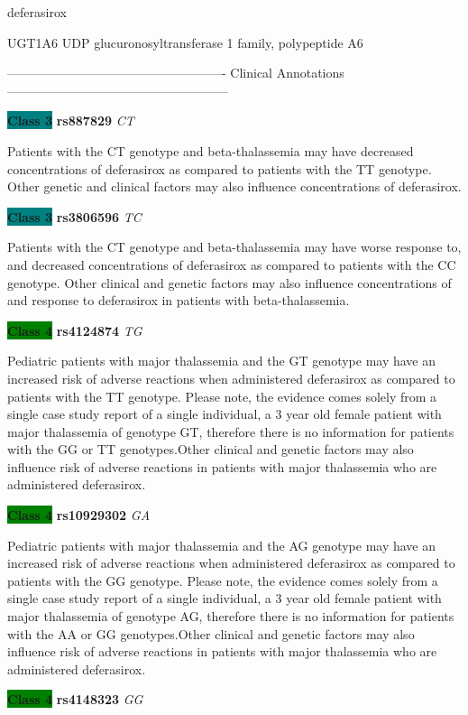 \documentclass{resume} %
\begin{document}
\begin{rSection}{ deferasirox }
\begin{rSubsection}{ UGT1A6 }{ UDP glucuronosyltransferase 1 family, polypeptide A6 }{}{}
\item[] ---------------------------------------------------- Clinical Annotations -----------------------------------------------------\newline
\item \textbf{\colorbox{teal} {Class 3}} \textbf{ rs887829 } \textit{ CT }
\item[] Patients with the CT genotype and beta-thalassemia may have decreased concentrations of deferasirox as compared to patients with the TT genotype. Other genetic and clinical factors may also influence concentrations of deferasirox.\item \textbf{\colorbox{teal} {Class 3}} \textbf{ rs3806596 } \textit{ TC }
\item[] Patients with the CT genotype and beta-thalassemia may have worse response to, and decreased concentrations of deferasirox as compared to patients with the CC genotype. Other clinical and genetic factors may also influence concentrations of and response to deferasirox in patients with beta-thalassemia.\item \textbf{\colorbox{green} {Class 4}} \textbf{ rs4124874 } \textit{ TG }
\item[] Pediatric patients with major thalassemia and the GT genotype may have an increased risk of adverse reactions when administered deferasirox as compared to patients with the TT genotype. Please note, the evidence comes solely from a single case study report of a single individual, a 3 year old female patient with major thalassemia of genotype GT, therefore there is no information for patients with the GG or TT genotypes.Other clinical and genetic factors may also influence risk of adverse reactions in patients with major thalassemia who are administered deferasirox. \item \textbf{\colorbox{green} {Class 4}} \textbf{ rs10929302 } \textit{ GA }
\item[] Pediatric patients with major thalassemia and the AG genotype may have an increased risk of adverse reactions when administered deferasirox as compared to patients with the GG genotype. Please note, the evidence comes solely from a single case study report of a single individual, a 3 year old female patient with major thalassemia of genotype AG, therefore there is no information for patients with the AA or GG genotypes.Other clinical and genetic factors may also influence risk of adverse reactions in patients with major thalassemia who are administered deferasirox.\item \textbf{\colorbox{green} {Class 4}} \textbf{ rs4148323 } \textit{ GG }

\end{rSubsection}
\end{rSection}
\end{document}
